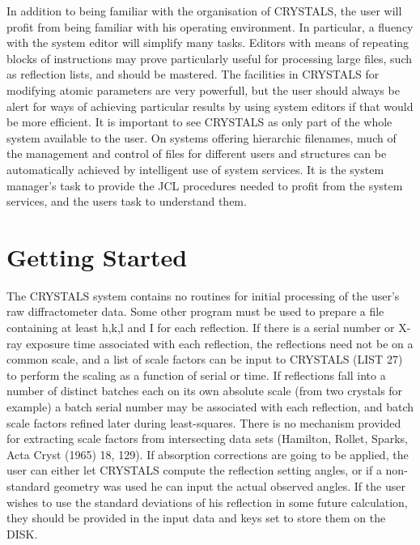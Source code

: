 \documentclass[10pt,a4paper]{report}
\begin{document}
In addition to being familiar  with the organisation of CRYSTALS, the user
 will profit from being familiar with his operating environment. In particular,
 a fluency with the system editor will simplify many tasks. Editors with
 means of repeating blocks of instructions may prove particularly useful
 for processing large files, such as reflection lists, and should be mastered.
 The facilities in CRYSTALS for modifying atomic parameters are very powerfull,
 but the user should always be alert for ways of achieving particular results
 by using system editors if that would be more efficient.  It is important
 to see CRYSTALS as only part of the whole system available to the user.
 On systems offering hierarchic filenames, much of the management and control
 of files for different users and structures can be automatically achieved
 by intelligent use of system services. It is the system manager's task to
 provide the JCL procedures needed to profit from the system services,
 and the users task to understand them.



\chapter{Getting Started}




The CRYSTALS system contains no routines for initial processing of the  user's raw diffractometer data. Some other program must be used to prepare a file containing at least h,k,l and I for each reflection. If there is a serial number or X-ray exposure time associated with each reflection, the reflections need not be  on a common scale, and a list of scale factors can be input to CRYSTALS (LIST 27) to perform the scaling as a function of serial or time. If reflections fall into a number of distinct batches each on its own absolute scale (from two crystals for example) a batch serial number may be associated with each reflection, and batch scale factors refined later during least-squares. There is no mechanism provided for extracting scale factors from intersecting data sets (Hamilton, Rollet, Sparks, Acta Cryst (1965) 18, 129). If absorption corrections are going to be applied, the user can either let CRYSTALS compute the reflection setting angles, or if a non-standard geometry was used he can input the actual observed angles. If the user wishes to use the standard deviations of his reflection in some future calculation, they should be provided in the input data and keys set to store them on the DISK.
\end{document}
